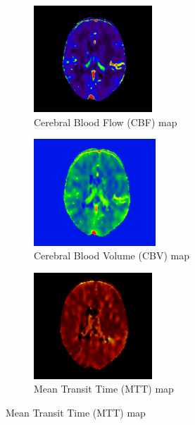 \begin{figure}[htbp]
    \centering
    \begin{subfigure}[t]{0.3\textwidth}
        \includegraphics[width=\textwidth,height=4cm,keepaspectratio]{figures/perfusion_cbf.png}
        \caption{Cerebral Blood Flow (CBF) map}
        \label{fig:cbf}
    \end{subfigure}
    \hfill
    \begin{subfigure}[t]{0.3\textwidth}
        \includegraphics[width=\textwidth,height=4cm,keepaspectratio]{figures/perfusion_cbv.png}
        \caption{Cerebral Blood Volume (CBV) map}
        \label{fig:cbv}
    \end{subfigure}
    \hfill
    \begin{subfigure}[t]{0.3\textwidth}
        \includegraphics[width=\textwidth,height=4cm,keepaspectratio]{figures/perfusion_mtt.png}
        \caption{Mean Transit Time (MTT) map}
        \label{fig:mtt}
    \end{subfigure}
    
    \vspace{0.5cm}
    

\end{figure}
